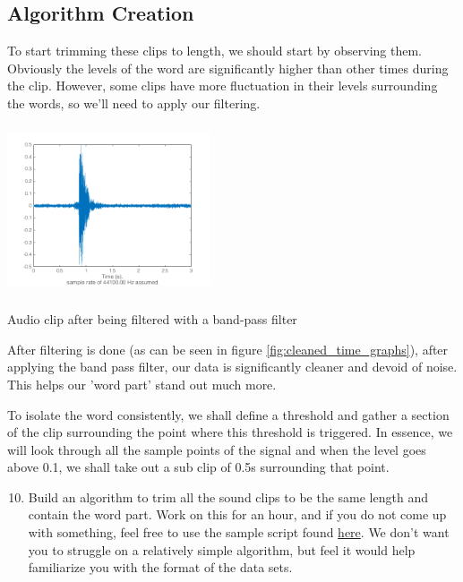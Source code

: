 \documentclass{tufte-handout}
\begin{document}
\subsection{Algorithm Creation}
To start trimming these clips to length, we should start by observing them. Obviously the levels of the word are significantly higher than other times during the clip. However, some clips have more fluctuation in their levels surrounding the words, so we'll need to apply our filtering.


\begin{marginfigure}
	\includegraphics[width = 6cm, height = 5cm]{cleaned_time_2.png}
	\caption{Audio clip after being filtered with a band-pass filter}
	\label{fig:cleaned_time_graphs}
\end{marginfigure}
After filtering is done (as can be seen in figure \ref{fig:cleaned_time_graphs}), after applying the band pass filter, our data is significantly cleaner and devoid of noise. This helps our 'word part' stand out much more.

To isolate the word consistently, we shall define a threshold and gather a section of the clip surrounding the point where this threshold is triggered. In essence, we will look through all the sample points of the signal and when the level goes above 0.1, we shall take out a sub clip of 0.5s surrounding that point. 

\begin{enumerate}
	\setcounter{enumi}{9}
	\item Build an algorithm to trim all the sound clips to be the same length and contain the word part. Work on this for an hour, and if you do not come up with something, feel free to use the sample script found \href{#}{here}. We don't want you to struggle on a relatively simple algorithm, but feel it would help familiarize you with the format of the data sets. 
\end{enumerate}
\end{document}
